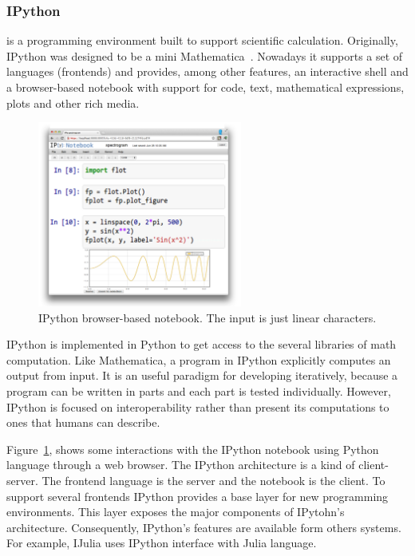 \subsubsection{IPython~\cite{PER-GRA:2007}} is a programming environment built to support scientific calculation. Originally, IPython was designed to be a mini Mathematica~\cite{wolfram1991mathematica}. Nowadays it supports a set of languages (frontends) and provides, among other features, an interactive shell and a browser-based notebook with support for code, text, mathematical expressions, plots and other rich media. 

\begin{figure}
  \vspace{-35pt}
  \begin{center}
    \includegraphics[width=0.6\textwidth]{img/ipython-zoom}
  \end{center}
  \vspace{-25pt}
 \caption{IPython browser-based notebook. The input is just linear characters.}  
  \vspace{-15pt}
    \label{fig:ipython}
\end{figure}

IPython is implemented in Python to get access to the several libraries of math computation. Like Mathematica, a program in IPython explicitly computes an output from input. It is an useful paradigm for developing iteratively, because a program can be written in parts and each part is tested individually. However, IPython is focused on interoperability rather than present its computations to ones that humans can describe.


Figure~\ref{fig:ipython}, shows some interactions with the IPython notebook using Python language through a web browser. The IPython architecture is a kind of client-server. The frontend language is the server and the notebook is the client. To support several frontends IPython provides a base layer for new programming environments. This layer exposes the major components of IPytohn's architecture. Consequently, IPython's features are available form others systems. For example, IJulia uses IPython interface with Julia language. 
